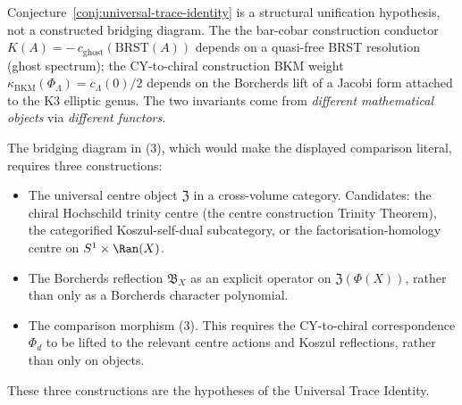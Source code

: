 \begin{remark}
\label{rem:universal-trace-identity-bridge}
Conjecture~\ref{conj:universal-trace-identity} is a structural unification
hypothesis, not a constructed bridging diagram. The the bar-cobar construction conductor
$K(A) = -\,c_{\mathrm{ghost}}(\mathrm{BRST}(A))$ depends on a quasi-free
BRST resolution \textup{(}ghost spectrum\textup{);} the CY-to-chiral construction BKM
weight $\kappa_{\mathrm{BKM}}(\Phi_\Lambda) = c_\Lambda(0)/2$
depends on the Borcherds lift of a Jacobi form attached to the K$3$
elliptic genus. The two invariants come from \emph{different mathematical
objects} via \emph{different functors}.

The bridging diagram in (3), which would make the displayed comparison
literal, requires
three constructions:
\begin{itemize}
 \item The universal centre object $\mathfrak{Z}$ in a cross-volume
 category. Candidates: the chiral Hochschild trinity centre
 \textup{(}the centre construction Trinity Theorem\textup{),} the categorified
 Koszul-self-dual subcategory, or the factorisation-homology centre
 on $S^1 \times \Ran(X)$.
 \item The Borcherds reflection $\mathfrak{B}_X$ as an explicit operator
 on $\mathfrak{Z}(\Phi(X))$, rather than only as a Borcherds character
 polynomial.
 \item The comparison morphism (3). This requires the CY-to-chiral
 correspondence $\Phi_d$ to be lifted to the relevant centre actions and
 Koszul reflections, rather than only on objects.
\end{itemize}
These three constructions are the hypotheses of the Universal Trace
Identity.
\end{remark}

